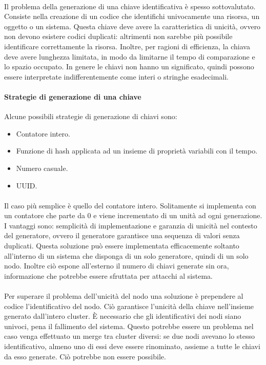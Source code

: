 \documentclass[11pt,a4paper,english]{article}
\begin{document}
\paragraph{} Il problema della generazione di una chiave identificativa\cite{key} è spesso sottovalutato. Consiste nella creazione di un codice che identifichi univocamente una risorsa, un oggetto o un sistema. Questa chiave deve avere la caratteristica di unicità, ovvero non devono esistere codici duplicati: altrimenti non sarebbe più possibile identificare correttamente la risorsa. Inoltre, per ragioni di efficienza, la chiava deve avere lunghezza limitata, in modo da limitarne il tempo di comparazione e lo spazio occupato. In genere le chiavi non hanno un significato, quindi possono essere interpretate indifferentemente come interi o stringhe esadecimali.  

\paragraph{Strategie di generazione di una chiave} Alcune possibili strategie di generazione di chiavi sono: \begin{itemize}
	\item Contatore intero.
	\item Funzione di hash applicata ad un insieme di proprietà variabili con il tempo.
	\item Numero casuale.
	\item UUID.
\end{itemize}

\paragraph{} Il caso più semplice è quello del contatore intero. Solitamente si implementa con un contatore che parte da 0 e viene incrementato di un unità ad ogni generazione. I vantaggi sono: semplicità di implementazione e garanzia di unicità nel contesto del generatore, ovvero il generatore garantisce una sequenza di valori senza duplicati. Questa soluzione può essere implementata efficacemente soltanto all'interno di un sistema che disponga di un solo generatore, quindi di un solo nodo. Inoltre ciò espone all'esterno il numero di chiavi generate sin ora, informazione che potrebbe essere sfruttata per attacchi al sistema. 

\paragraph{} Per superare il problema dell'unicità del nodo una soluzione è prependere al codice l'identificativo del nodo. Ciò garantisce l'unicità della chiave nell'insieme generato dall'intero cluster. È necessario che gli identificativi dei nodi siano univoci, pena il fallimento del sistema. Questo potrebbe essere un problema nel caso venga effettuato un merge tra cluster diversi: se due nodi avevano lo stesso identificativo, almeno uno di essi deve essere rinominato, assieme a tutte le chiavi da esso generate. Ciò potrebbe non essere possibile.  
\end{document}
